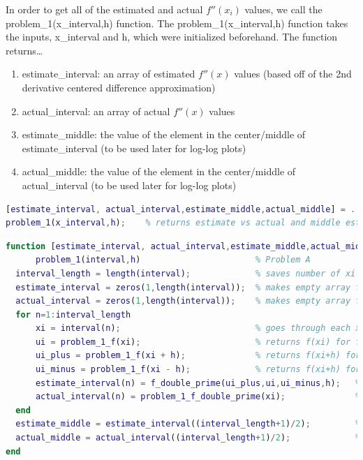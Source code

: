 \documentclass[10pt,letterpaper]{article}
\begin{document}
\begin{enumerate}[a)]
    In order to get all of the estimated and actual $f''(x_{i})$ values, we call the problem\_1(x\_interval,h) function.
    The problem\_1(x\_interval,h) function takes the inputs, x\_interval and h, which were initialized beforehand. The function returns\ldots 
    \begin{enumerate}
      \item estimate\_interval: an array of estimated $f''(x)$ values (based off of the 2nd derivative centered difference approximation)
      \item actual\_interval: an array of actual $f''(x)$ values
      \item estimate\_middle: the value of the element in the center/middle of estimate\_interval (to be used later for log-log plots)
      \item actual\_middle: the value of the element in the center/middle of actual\_interval (to be used later for log-log plots)
    \end{enumerate}
     \begin{lstlisting}[language = Matlab]
[estimate_interval, actual_interval,estimate_middle,actual_middle] = ...
problem_1(x_interval,h);    % returns estimate vs actual and middle estimate vs actual for reference
\end{lstlisting}
     \begin{lstlisting}[language = Matlab]
function [estimate_interval, actual_interval,estimate_middle,actual_middle] = ...
      problem_1(interval,h)                       % Problem A
  interval_length = length(interval);             % saves number of xi's in x_interval
  estimate_interval = zeros(1,length(interval));  % makes empty array for estimate f"(x)
  actual_interval = zeros(1,length(interval));    % makes empty array for actual f"(x)
  for n=1:interval_length
      xi = interval(n);                           % goes through each xi
      ui = problem_1_f(xi);                       % returns f(xi) for f"(xi) estimation
      ui_plus = problem_1_f(xi + h);              % returns f(xi+h) for f"(xi) estimation
      ui_minus = problem_1_f(xi - h);             % returns f(xi+h) for f"(xi) estimation
      estimate_interval(n) = f_double_prime(ui_plus,ui,ui_minus,h);   % estimate f"(xi)
      actual_interval(n) = problem_1_f_double_prime(xi);              % actual f"(xi)
  end
  estimate_middle = estimate_interval((interval_length+1)/2);         % since x_interval will always have an odd number of values,
  actual_middle = actual_interval((interval_length+1)/2);             % (interval_length+1)/2 will always return middle estimate/actual
end
\end{lstlisting}


\end{enumerate}
\end{document}

